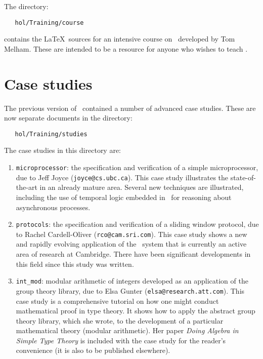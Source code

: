 The  directory:

\begin{hol}\begin{verbatim}
   hol/Training/course
\end{verbatim}\end{hol}

\noindent contains the \LaTeX\ sources for an intensive course on \HOL\
developed by Tom Melham. These are intended to be a resource for anyone who
wishes to teach \HOL.

\section*{Case studies}

The previous version of \TUTORIAL\ contained a number of advanced case
studies. These are now separate documents in the directory:

\begin{hol}\begin{verbatim}
   hol/Training/studies
\end{verbatim}\end{hol}

\noindent The case studies in this directory are:

\begin{enumerate}
\item {\tt microprocessor}:  the specification and verification of a simple
microprocessor, due to Jeff Joyce ({\verb+joyce@cs.ubc.ca+}).
This case study illustrates the
state-of-the-art in an already mature area. Several new techniques are
illustrated, including the use of temporal logic embedded in \HOL\ for
reasoning about asynchronous processes.
\item {\tt protocols}: the specification and verification of a sliding window
protocol, due to Rachel Cardell-Oliver ({\verb+rco@cam.sri.com+}).
This case study shows a new and
rapidly evolving application of the \HOL\ system that is currently an
active area of research at Cambridge. There have been significant developments 
in this field since this study was written.
\item {\tt int\_mod}: modular arithmetic of integers
developed as an application of the group
theory library, due to Elsa Gunter ({\verb+elsa@research.att.com+}).
This case study
is a comprehensive
tutorial on how one might conduct mathematical proof in type theory.
It shows how to apply the abstract group theory library, which she
wrote, to the development of a particular mathematical theory (modular
arithmetic).  Her paper {\sl Doing Algebra in Simple Type Theory} is
included with the case study for the reader's convenience (it is also
to be published elsewhere).
\end{enumerate}

